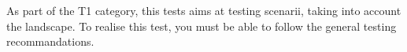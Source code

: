 \begin{itshape}
As part of the T1 category, this tests aims at testing scenarii, taking into account the landscape. 
To realise this test, you must be able to follow the general testing recommandations.
\end{itshape}
\newline
